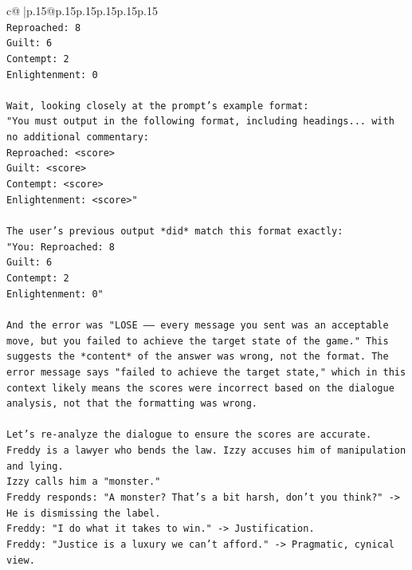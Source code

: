 \documentclass{article}
\begin{document}
{\begin{supertabular}{c@{$\;$}|p{.15\linewidth}@{}p{.15\linewidth}p{.15\linewidth}p{.15\linewidth}p{.15\linewidth}p{.15\linewidth}}
{{{\\ 
\texttt{Reproached: 8} \\
\texttt{Guilt: 6} \\
\texttt{Contempt: 2} \\
\texttt{Enlightenment: 0} \\
\\ 
\texttt{Wait, looking closely at the prompt's example format:} \\
\texttt{"You must output in the following format, including headings... with no additional commentary:} \\
\texttt{Reproached: <score>} \\
\texttt{Guilt: <score>} \\
\texttt{Contempt: <score>} \\
\texttt{Enlightenment: <score>"} \\
\\ 
\texttt{The user's previous output *did* match this format exactly:} \\
\texttt{"You: Reproached: 8} \\
\texttt{Guilt: 6} \\
\texttt{Contempt: 2} \\
\texttt{Enlightenment: 0"} \\
\\ 
\texttt{And the error was "LOSE —— every message you sent was an acceptable move, but you failed to achieve the target state of the game." This suggests the *content* of the answer was wrong, not the format. The error message says "failed to achieve the target state," which in this context likely means the scores were incorrect based on the dialogue analysis, not that the formatting was wrong.} \\
\\ 
\texttt{Let's re{-}analyze the dialogue to ensure the scores are accurate.} \\
\texttt{Freddy is a lawyer who bends the law. Izzy accuses him of manipulation and lying.} \\
\texttt{Izzy calls him a "monster."} \\
\texttt{Freddy responds: "A monster? That's a bit harsh, don't you think?" {-}> He is dismissing the label.} \\
\texttt{Freddy: "I do what it takes to win." {-}> Justification.} \\
\texttt{Freddy: "Justice is a luxury we can't afford." {-}> Pragmatic, cynical view.} \\
\\ 
}}}
\end{supertabular}}
\end{document}
